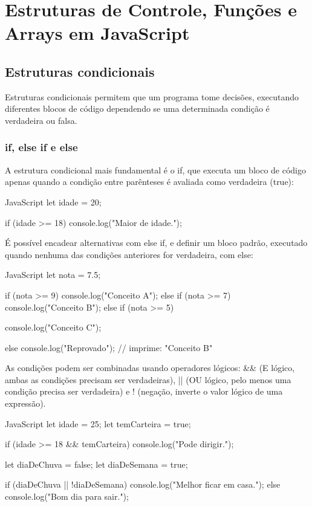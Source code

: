 \chapter{Estruturas de Controle, Funções e Arrays em JavaScript}

\section{Estruturas condicionais}

Estruturas condicionais permitem que um programa tome decisões, executando diferentes blocos de código dependendo se uma determinada condição é verdadeira ou falsa.

\subsection{if, else if e else}

A estrutura condicional mais fundamental é o if, que executa um bloco de código apenas quando a condição entre parênteses é avaliada como verdadeira (true):

\begin{codebox}{JavaScript}
let idade = 20;

if (idade >= 18) {
  console.log("Maior de idade.");
}
\end{codebox}

É possível encadear alternativas com else if, e definir um bloco padrão, executado quando nenhuma das condições anteriores for verdadeira, com else:

\begin{codebox}{JavaScript}
let nota = 7.5;

if (nota >= 9) {
  console.log("Conceito A");
} else if (nota >= 7) {
  console.log("Conceito B");
} else if (nota >= 5) {
  console.log("Conceito C");



} else {
  console.log("Reprovado");
}
// imprime: "Conceito B"
\end{codebox}

As condições podem ser combinadas usando operadores lógicos: \&\& (E lógico, ambas as condições precisam ser verdadeiras), || (OU lógico, pelo menos uma condição precisa ser verdadeira) e ! (negação, inverte o valor lógico de uma expressão).

\begin{codebox}{JavaScript}
let idade = 25;
let temCarteira = true;

if (idade >= 18 && temCarteira) {
  console.log("Pode dirigir.");
}

let diaDeChuva = false;
let diaDeSemana = true;

if (diaDeChuva || !diaDeSemana) {
  console.log("Melhor ficar em casa.");
} else {
  console.log("Bom dia para sair.");
}
\end{codebox}

